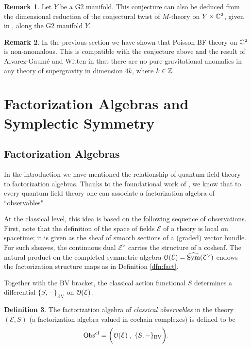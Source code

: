 \documentclass[11pt, oneside, reqno]{amsart}
\theoremstyle{definition} \newtheorem{definition}{Definition}[section]
\theoremstyle{definition}
\theoremstyle{remark}
\theoremstyle{definition} \newtheorem{remark}[definition]{Remark}
\theoremstyle{definition} \newtheorem{remarks}[definition]{Remarks}
\theoremstyle{definition} \newtheorem{question}[definition]{Question}
\theoremstyle{definition} \newtheorem*{note}{Note}
\theoremstyle{definition} \newtheorem{example}[definition]{Example}
\theoremstyle{definition} \newtheorem{examples}[definition]{Examples}
\def\Hat{\widehat}
\def\Sym{{\rm Sym}}
\def\cE{\mathcal E}\def\cF{\mathcal F}\def\cG{\mathcal G}\def\cH{\mathcal H}
\newcommand{\mr}[1]{\mathrm{#1}}
\newcommand{\mc}[1]{\mathcal{#1}}
\newcommand{\Obs}{\mathrm{Obs}}
\begin{document}
\begin{remark}
Let $Y$ be a G2 manifold.
This conjecture can also be deduced from the dimensional reduction of the conjectural twist of $M$-theory on $Y \times \mathbb C^2$, given in \cite{PhilSurya}, along the G2 manifold $Y$. 
\end{remark}

\begin{remark}
In the previous section we have shown that Poisson BF theory on $\mathbb C^2$ is non-anomalous. 
This is compatible with the conjecture above and the result of Alvarez-Gaum\'{e} and Witten in \cite{GaumeWittenSUGRA} that there are no pure gravitational anomalies in any theory of supergravity in dimension $4k$, where $k \in \mathbb Z$.
\end{remark}

\section{Factorization Algebras and Symplectic Symmetry} \label{factn_section}

\subsection{Factorization Algebras}

In the introduction we have mentioned the relationship of quantum field theory to factorization algebras. 
Thanks to the foundational work of \cite{Book2}, we know that to every quantum field theory one can associate a factorization algebra of ``observables".  

At the classical level, this idea is based on the following sequence of observations.
First, note that the definition of the space of fields $\cE$ of a theory is local on spacetime; it is given as the sheaf of smooth sections of a (graded) vector bundle. 
For such sheaves, the continuous dual $\cE^\vee$ carries the structure of a cosheaf. 
The natural product on the completed symmetric algebra $\cO (\cE) = \Hat{\Sym}(\cE^\vee)$ endows the factorization structure maps as in Definition \ref{dfn:fact}. 

Together with the BV bracket, the classical action functional $S$ determines a differential $\{S, -\}_{\mr{BV}}$ on $\cO(\cE)$.
\begin{definition}
The factorization algebra of \emph{classical observables} in the theory $(\mc E, S)$ (a factorization algebra valued in cochain complexes)  is defined to be
\[\Obs^{\rm cl} = \bigg(\cO(\cE) \; , \; \{S,-\}_{\mr{BV}} \bigg) .\]
\end{definition}
\end{document}
